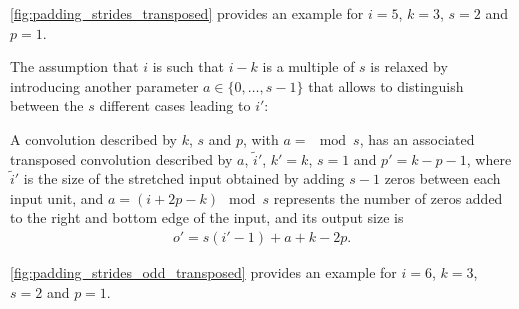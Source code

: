 \documentclass{article}
\begin{document}
\autoref{fig:padding_strides_transposed} provides an example for $i = 5$, $k =
3$, $s = 2$ and $p = 1$.

The assumption that $i$ is such that $i - k$ is a multiple of $s$ is relaxed by
introducing another parameter $a \in \{0, \ldots, s - 1\}$ that allows to
distinguish between the $s$ different cases leading to $i'$:

\begin{prop}\label{prop:padding_strides_transposed_odd}
A convolution described by $k$, $s$ and $p$, with $a = \mod s$,
has an associated transposed convolution described by $a$, $\tilde{i}'$,
$k' = k$, $s = 1$ and $p' = k - p - 1$, where
$\tilde{i}'$ is the size of the stretched input obtained by adding $s - 1$ zeros
between each input unit, and $a = (i + 2p - k) \mod s$ represents the number of
zeros added to the right and bottom edge of the input, and its output size is
\begin{equation*}
\begin{split}
    o' = s (i' - 1) + a + k - 2p.
\end{split}
\end{equation*}
\end{prop}

\autoref{fig:padding_strides_odd_transposed} provides an example for $i = 6$, $k
= 3$, $s = 2$ and $p = 1$.



\end{document}
